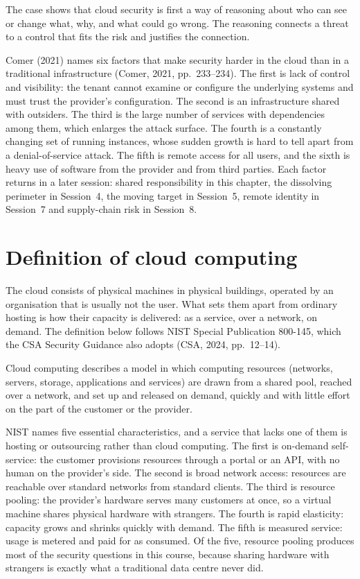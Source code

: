 The case shows that cloud security is first a way of reasoning about who can
see or change what, why, and what could go wrong. The reasoning connects a
threat to a control that fits the risk and justifies the connection.

Comer (2021) names six factors that make security harder in the cloud than in
a traditional infrastructure (Comer, 2021, pp.~233--234). The first is lack
of control and visibility: the tenant cannot examine or configure the
underlying systems and must trust the provider's configuration. The second is
an infrastructure shared with outsiders. The third is the large number of
services with dependencies among them, which enlarges the attack surface. The
fourth is a constantly changing set of running instances, whose sudden growth
is hard to tell apart from a denial-of-service attack. The fifth is remote
access for all users, and the sixth is heavy use of software from the
provider and from third parties. Each factor returns in a later session:
shared responsibility in this chapter, the dissolving perimeter in
Session~4, the moving target in Session~5, remote identity in Session~7 and
supply-chain risk in Session~8.

\section{Definition of cloud computing}

The cloud consists of physical machines in physical buildings, operated by
an organisation that is usually not the user. What sets them apart from
ordinary hosting is how their capacity is delivered: as a service, over a
network, on demand. The definition below follows NIST Special Publication
800-145, which the CSA Security Guidance also adopts (CSA, 2024,
pp.~12--14).

\begin{definition}\label{def:cloud}
Cloud computing describes a model in which computing resources (networks,
servers, storage, applications and services) are drawn from a shared pool,
reached over a network, and set up and released on demand, quickly and with
little effort on the part of the customer or the provider.
\end{definition}

NIST names five essential characteristics, and a service that lacks one of
them is hosting or outsourcing rather than cloud computing. The first is
on-demand self-service: the customer provisions resources through a portal
or an API, with no human on the provider's side. The second is broad network
access: resources are reachable over standard networks from standard
clients. The third is resource pooling: the provider's hardware serves many
customers at once, so a virtual machine shares physical hardware with
strangers. The fourth is rapid elasticity: capacity grows and shrinks quickly
with demand. The fifth is measured service: usage is metered and paid for as
consumed. Of the five, resource pooling produces most of the security
questions in this course, because sharing hardware with strangers is exactly
what a traditional data centre never did.


